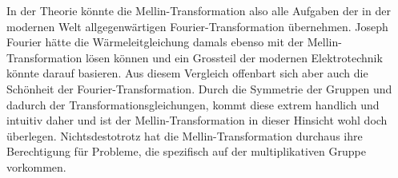 In der Theorie könnte die Mellin-Transformation also alle Aufgaben 
der in der modernen Welt allgegenwärtigen Fourier-Transformation 
übernehmen. 
Joseph Fourier hätte die Wärmeleitgleichung damals ebenso mit der 
Mellin-Transformation lösen können und ein Grossteil der modernen 
Elektrotechnik könnte darauf basieren. 
Aus diesem Vergleich offenbart sich aber auch die Schönheit der 
Fourier-Transformation. 
Durch die Symmetrie der Gruppen und dadurch der 
Transformationsgleichungen, kommt diese extrem handlich und intuitiv 
daher und ist der Mellin-Transformation in dieser Hinsicht 
wohl doch überlegen.
Nichtsdestotrotz hat die Mellin-Transformation durchaus ihre 
Berechtigung für Probleme, die spezifisch auf der multiplikativen 
Gruppe vorkommen.



